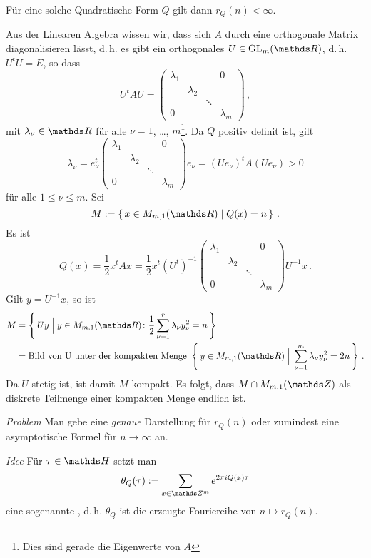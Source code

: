 \begin{lemm}
Für eine solche Quadratische Form $Q$ gilt dann $r_Q(n) < \infty$.
\end{lemm}

\begin{bewe}
Aus der Linearen Algebra wissen wir, dass sich $A$ durch eine orthogonale Matrix diagonalisieren lässt, d.\,h. es gibt ein orthogonales $U \in \GL_m(\RR)$, d.\,h. $U^tU = E$, so dass
\[
	U^tAU =
	\begin{pmatrix}
	\lambda_1 & & & 0 \\
	& \lambda_2 \\
	& & \ddots \\
	0 & & & \lambda_m
	\end{pmatrix}
	\,,
\]
mit $\lambda_\nu \in \RR$ für alle $\nu=1$, \ldots, $m$\footnote{Dies sind gerade die Eigenwerte von $A$}.
Da $Q$ positiv definit ist, gilt
\[
	\lambda_\nu =
	e_\nu^t
			\begin{pmatrix}
			\lambda_1 & & & 0 \\
			& \lambda_2 \\
			& & \ddots \\
			0 & & & \lambda_m
			\end{pmatrix}
		e_\nu
	= (Ue_\nu)^tA(Ue_\nu)
	> 0
\]
für alle $1 \leq \nu \leq m$. Sei
\[
	M
	:= \Set{x\in M_{m,1}(\RR) \mid Q(x) = n}
	\,.
\]
Es ist
\[
	Q(x)
	= \frac{1}{2}x^tAx
	= \frac{1}{2} x^t(U ^t)^{-1}
			\begin{pmatrix}
			\lambda_1 & & & 0 \\
			& \lambda_2 \\
			& & \ddots \\
			0 & & & \lambda_m
			\end{pmatrix}
		U^{-1}x
		\,.
\]
Gilt $y = U^{-1} x$, so ist
\begin{align*}
	M &= \Set{Uy \;\Big|\; y \in M_{m,1}(\RR)\colon \frac{1}{2} \sum_{\nu=1}^r \lambda_\nu y_\nu^2 = n} \\
	&= \text{Bild von U unter der kompakten Menge } \Set{y \in M_{m,1}(\RR) \;\Big|\; \sum_{\nu=1}^m \lambda_\nu y_\nu^2 = 2n}
	\,.
\end{align*}
Da $U$ stetig ist, ist damit $M$ kompakt.
Es folgt, dass $M \cap M_{m,1}(\ZZ)$ als diskrete Teilmenge einer kompakten Menge endlich ist.
\end{bewe}

\emph{Problem} Man gebe eine \emph{genaue} Darstellung für $r_Q(n)$ oder zumindest eine asymptotische Formel für $n \to \infty$ an.

\emph{Idee} Für $\tau\in\HH$ setzt man
\[
	\theta_Q(\tau)
	:= \sum_{x\in\ZZ^m} e^{2\pi i Q(x) \tau}
\]
eine sogenannte , d.\,h. $\theta_Q$ ist die erzeugte Fouriereihe von $n \mapsto r_Q(n)$.

